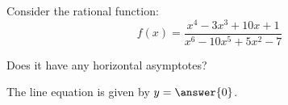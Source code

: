 \documentclass{ximera}
\author{Ivo Terek}
\begin{document}
\begin{exercise}

  Consider the rational function:
  $$ f(x) = \frac{x^4-3x^3 + 10x+1}{x^6-10x^5 + 5x^2-7}   $$

  Does it have any horizontal asymptotes?

  \begin{multipleChoice}
  \end{multipleChoice}

  \begin{exercise}
    The line equation is given by $y= \answer{0}$.
  \end{exercise}
  
\end{exercise}
\end{document}
